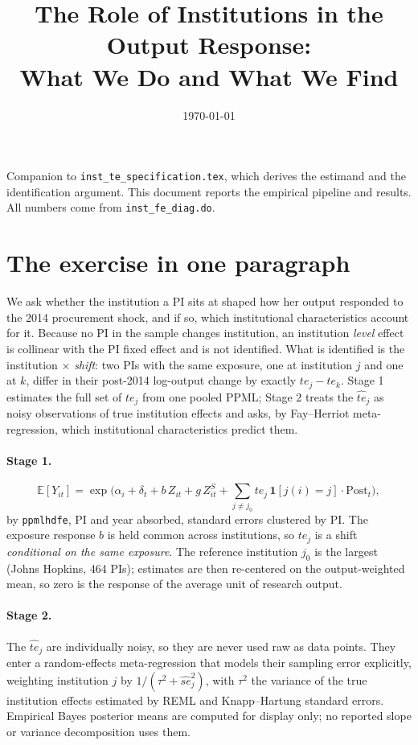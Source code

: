 \documentclass[11pt]{article}
\title{The Role of Institutions in the Output Response:\\ What We Do and What We Find}
\author{}
\date{\today}
\newcommand{\E}{\mathbb{E}}
\newcommand{\Post}{\mathrm{Post}}
\begin{document}
\maketitle

\noindent
Companion to \texttt{inst\_te\_specification.tex}, which derives the estimand
and the identification argument. This document reports the empirical pipeline
and results. All numbers come from \texttt{inst\_fe\_diag.do}.

\section{The exercise in one paragraph}

We ask whether the institution a PI sits at shaped how her output responded
to the 2014 procurement shock, and if so, which institutional
characteristics account for it. Because no PI in the sample changes
institution, an institution \emph{level} effect is collinear with the PI
fixed effect and is not identified. What is identified is the institution
$\times$ \Post{} \emph{shift}: two PIs with the same exposure, one at
institution $j$ and one at $k$, differ in their post-2014 log-output change
by exactly $te_j - te_k$. Stage 1 estimates the full set of $te_j$ from one
pooled PPML; Stage 2 treats the $\widehat{te}_j$ as noisy observations of
true institution effects and asks, by Fay--Herriot meta-regression, which
institutional characteristics predict them.

\paragraph{Stage 1.}
\[
\E[Y_{it}] = \exp\Big( \alpha_i + \delta_t + b\,Z_{it} + g\,Z^{S}_{it}
+ \textstyle\sum_{j \neq j_0} te_j\,\mathbf{1}[j(i)=j]\cdot \Post_t \Big),
\]
by \texttt{ppmlhdfe}, PI and year absorbed, standard errors clustered by PI.
The exposure response $b$ is held common across institutions, so $te_j$ is a
shift \emph{conditional on the same exposure}. The reference institution
$j_0$ is the largest (Johns Hopkins, 464 PIs); estimates are then re-centered
on the output-weighted mean, so zero is the response of the average unit of
research output.

\paragraph{Stage 2.}
The $\widehat{te}_j$ are individually noisy, so they are never used raw as
data points. They enter a random-effects meta-regression that models their
sampling error explicitly, weighting institution $j$ by
$1/(\tau^2 + \widehat{se}_j^2)$, with $\tau^2$ the variance of the true
institution effects estimated by REML and Knapp--Hartung standard errors.
Empirical Bayes posterior means are computed for display only; no reported
slope or variance decomposition uses them.
\end{document}
